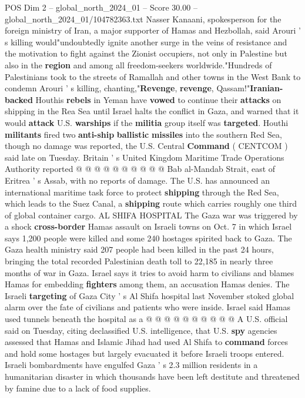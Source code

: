 \begin{textsample}{POS Dim 2 – global\_north\_2024\_01 – Score 30.00 – global\_north\_2024\_01/104782363.txt}
Nasser Kanaani, spokesperson for the foreign ministry of Iran, a major supporter of Hamas and Hezbollah, said Arouri ' s killing would"undoubtedly ignite another surge in the veins of resistance and the motivation to fight against the Zionist occupiers, not only in Palestine but also in the \textbf{region} and among all freedom-seekers worldwide."Hundreds of Palestinians took to the streets of Ramallah and other towns in the West Bank to condemn Arouri ' s killing, chanting,"\textbf{Revenge}, \textbf{revenge}, Qassam!"\textbf{Iranian-backed} Houthis \textbf{rebels} in Yeman have \textbf{vowed} to continue their \textbf{attacks} on shipping in the Rea Sea until Israel halts the conflict in Gaza, and warned that it would \textbf{attack} U.S. \textbf{warships} if the \textbf{militia} group itself was \textbf{targeted}.
Houthi \textbf{militants} fired two \textbf{anti-ship} \textbf{ballistic} \textbf{missiles} into the southern Red Sea, though no damage was reported, the U.S.
Central \textbf{Command} ( CENTCOM ) said late on Tuesday.
Britain ' s United Kingdom Maritime Trade Operations Authority reported @ @ @ @ @ @ @ @ @ @ Bab al-Mandab Strait, east of Eritrea ' s Assab, with no reports of damage.
The U.S. has announced an international maritime task force to protect \textbf{shipping} through the Red Sea, which leads to the Suez Canal, a \textbf{shipping} route which carries roughly one third of global container cargo.
AL SHIFA HOSPITAL The Gaza war was triggered by a shock \textbf{cross-border} Hamas assault on Israeli towns on Oct. 7 in which Israel says 1,200 people were killed and some 240 hostages spirited back to Gaza.
The Gaza health ministry said 207 people had been killed in the past 24 hours, bringing the total recorded Palestinian death toll to 22,185 in nearly three months of war in Gaza.
Israel says it tries to avoid harm to civilians and blames Hamas for embedding \textbf{fighters} among them, an accusation Hamas denies.
The Israeli \textbf{targeting} of Gaza City ' s Al Shifa hospital last November stoked global alarm over the fate of civilians and patients who were inside.
Israel said Hamas used tunnels beneath the hospital as a @ @ @ @ @ @ @ @ @ @ A U.S. official said on Tuesday, citing declassified U.S. intelligence, that U.S. \textbf{spy} agencies assessed that Hamas and Islamic Jihad had used Al Shifa to \textbf{command} forces and hold some hostages but largely evacuated it before Israeli troops entered.
Israeli bombardments have engulfed Gaza ' s 2.3 million residents in a humanitarian disaster in which thousands have been left destitute and threatened by famine due to a lack of food supplies.

\end{textsample}
